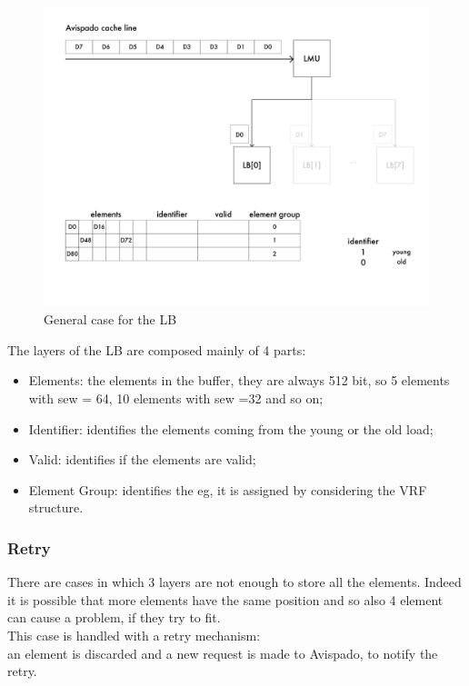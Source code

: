 \begin{figure}[H]
    \centering
    \includegraphics[scale = 0.4]{Chapter_2/img/cache-to-lb-genz-ex.png}
    \caption{General case for the LB}
    \label{lb-genz}
\end{figure}

The layers of the LB are composed mainly of 4 parts:
\begin{itemize}
    \item Elements: the elements in the buffer, they are always 512 bit, so 5 elements with sew = 64, 10 elements with sew =32 and so on;
    
    \item Identifier: identifies the elements coming from the young or the old load;
    
    \item Valid: identifies if the elements are valid;
    
    \item Element Group: identifies the eg, it is assigned by considering the VRF structure.
\end{itemize}

\subsubsection{Retry}
There are cases in which 3 layers are not enough to store all the elements. Indeed it is possible that more elements have the same position and so also 4 element can cause a problem, if they try to fit.\\

This case is handled with a retry mechanism:\\
an element is discarded and a new request is made to Avispado, to  notify the retry.\\

